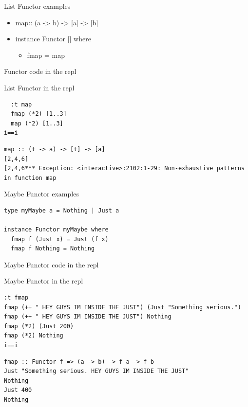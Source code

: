 \documentclass[presetation]{beamer}
\begin{document}
\begin{frame}[label={sec:org987fbd8}]{List Functor examples}
\begin{example}
\begin{itemize}
\item map:: (a -> b)  -> [a] -> [b]
\item instance Functor [] where
\begin{itemize}
\item fmap = map
\end{itemize}
\end{itemize}
\end{example}
\end{frame}


\begin{frame}[fragile,label={sec:orgcfa847a}]{Functor code in the repl}
 \begin{block}{List Functor in the repl}
\begin{verbatim}
  :t map
  fmap (*2) [1..3]
  map (*2) [1..3]
i==i
\end{verbatim}

\begin{verbatim}
map :: (t -> a) -> [t] -> [a]
[2,4,6]
[2,4,6*** Exception: <interactive>:2102:1-29: Non-exhaustive patterns in function map
\end{verbatim}
\end{block}
\end{frame}

\begin{frame}[fragile,label={sec:org616b8e4}]{Maybe Functor examples}
 \begin{example}
\begin{verbatim}
type myMaybe a = Nothing | Just a 

instance Functor myMaybe where
  fmap f (Just x) = Just (f x)
  fmap f Nothing = Nothing
\end{verbatim}
\end{example}
\end{frame}
\begin{frame}[fragile,label={sec:orgcdff65b}]{Maybe Functor code in the repl}
 \begin{block}{Maybe Functor in the repl}
\begin{verbatim}
:t fmap
fmap (++ " HEY GUYS IM INSIDE THE JUST") (Just "Something serious.")
fmap (++ " HEY GUYS IM INSIDE THE JUST") Nothing
fmap (*2) (Just 200)
fmap (*2) Nothing
i==i
\end{verbatim}

\begin{verbatim}
fmap :: Functor f => (a -> b) -> f a -> f b
Just "Something serious. HEY GUYS IM INSIDE THE JUST"
Nothing
Just 400
Nothing
\end{verbatim}
\end{block}
\end{frame}
\end{document}
